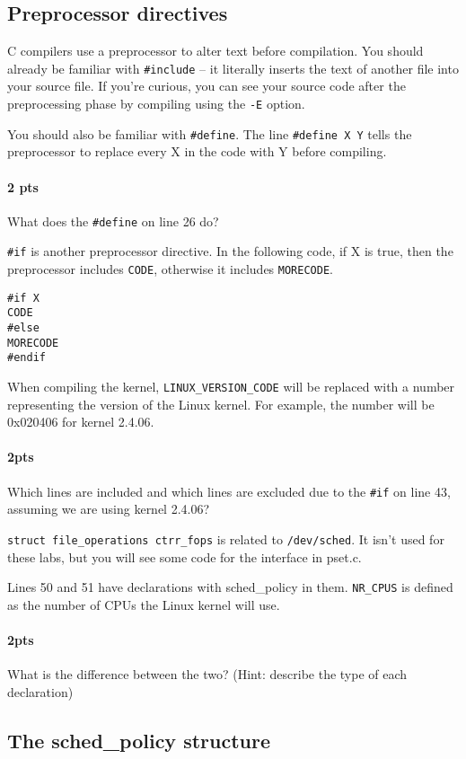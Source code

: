 \documentclass[letterpaper,10pt]{article}
\begin{document}
\subsection{Preprocessor directives}
C compilers use a preprocessor to alter text before compilation. You should already be
familiar with \verb+#include+ -- it literally inserts the text of another file into your source file. If
you're curious, you can see your source code after the preprocessing phase by
compiling using the \verb+-E+ option.

You should also be familiar with \verb=#define=. The line \verb=#define X Y= tells the preprocessor to
replace every X in the code with Y before compiling.

\paragraph{2 pts} What does the \verb=#define= on line 26 do?

\verb=#if= is another preprocessor directive. In the following code, if X is true, then the
preprocessor includes \verb=CODE=, otherwise it includes \verb=MORECODE=.
\begin{verbatim}
#if X
CODE
#else
MORECODE
#endif
\end{verbatim}
When compiling the kernel, \verb=LINUX_VERSION_CODE= will be replaced with a number
representing the version of the Linux kernel. For example, the number will be 0x020406
for kernel 2.4.06.

\paragraph{2pts} Which lines are included and which lines are excluded due to the \verb=#if= on
line 43, assuming we are using kernel 2.4.06?

\verb=struct file_operations ctrr_fops= is related to \verb=/dev/sched=. It isn't used for these labs,
but you will see some code for the interface in pset.c.

Lines 50 and 51 have declarations with sched\_policy in them. \verb=NR_CPUS= is defined as
the number of CPUs the Linux kernel will use.

\paragraph{2pts} What is the difference between the two? (Hint: describe the type of each
declaration)

\subsection{The sched\_policy structure}
\end{document}
